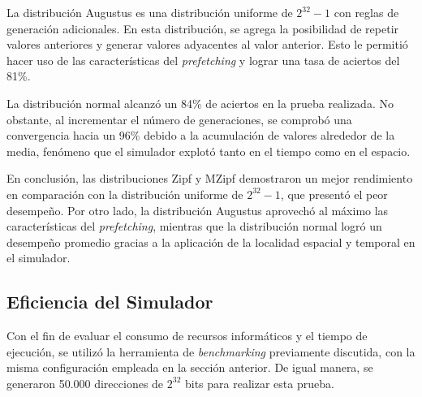 \documentclass[12pt]{article}
\begin{document}
La distribución Augustus es una distribución uniforme de $2^{32}-1$ con reglas de generación adicionales. En esta distribución, se agrega la posibilidad de repetir valores anteriores y generar valores adyacentes al valor anterior. Esto le permitió hacer uso de las características del \textit{prefetching} y lograr una tasa de aciertos del 81\%.
\newline

La distribución normal alcanzó un 84\% de aciertos en la prueba realizada. No obstante, al incrementar el número de generaciones, se comprobó una convergencia hacia un 96\% debido a la acumulación de valores alrededor de la media, fenómeno que el simulador explotó tanto en el tiempo como en el espacio.
\newline

En conclusión, las distribuciones Zipf y MZipf demostraron un mejor rendimiento en comparación con la distribución uniforme de $2^{32}-1$, que presentó el peor desempeño. Por otro lado, la distribución Augustus aprovechó al máximo las características del \textit{prefetching}, mientras que la distribución normal logró un desempeño promedio gracias a la aplicación de la localidad espacial y temporal en el simulador.
%
\subsection*{Eficiencia del Simulador}
\vspace{-5pt}
Con el fin de evaluar el consumo de recursos informáticos y el tiempo de ejecución, se utilizó la herramienta de \textit{benchmarking} previamente discutida, con la misma configuración empleada en la sección anterior. De igual manera, se generaron 50.000 direcciones de $2^{32}$ bits para realizar esta prueba.
\end{document}
